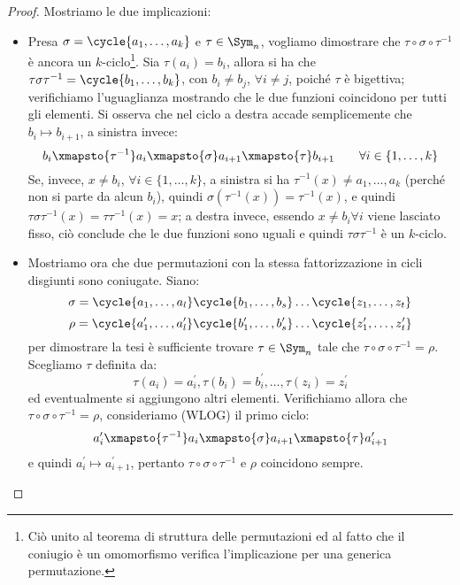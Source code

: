 \documentclass[11pt]{scrartcl}
\begin{document}
\begin{proof}
    Mostriamo le due implicazioni:
        \begin{itemize}
            \item Presa $\sigma = \cycle{a_1,\ldots,a_k}$ e $\tau \in \Sym_n$, vogliamo dimostrare che $\tau\circ\sigma\circ\tau^{-1}$ è ancora un $k$-ciclo\footnote{Ciò unito al teorema di struttura delle permutazioni ed al fatto che il coniugio è un omomorfismo verifica l'implicazione per una generica permutazione.}.
                Sia $\tau(a_i) = b_i$, allora si ha che $\tau\sigma\tau^{-1} = \cycle{b_1,\ldots,b_k}$, con $b_i \ne b_j$, $\forall i \ne j$, poiché $\tau$ è bigettiva; verifichiamo
                l'uguaglianza mostrando che le due funzioni coincidono per tutti gli elementi. Si osserva che nel ciclo a destra accade semplicemente che $b_i \longmapsto b_{i+1}$, a sinistra invece:
                    \[ b_i \xmapsto{\tau^{-1}} a_i \xmapsto{\sigma} a_{i+1} \xmapsto{\tau} b_{i+1} \qquad \forall i \in \{1,\ldots,k\}
                        \]
                Se, invece, $x \ne b_i$, $\forall i \in \{1,\ldots,k\}$, a sinistra si ha $\tau^{-1}(x) \ne a_1,\ldots,a_k$ (perché non si parte da alcun $b_i$), quindi $\sigma(\tau^{-1}(x)) = \tau^{-1}(x)$, e quindi
                $\tau\sigma\tau^{-1}(x) = \tau \tau^{-1} (x) = x$; a destra invece, essendo $x \ne b_i \forall i$ viene lasciato fisso, ciò conclude che le due funzioni sono uguali e quindi $\tau\sigma\tau^{-1}$ è un $k$-ciclo.
            \item Mostriamo ora che due permutazioni con la stessa fattorizzazione in cicli disgiunti sono coniugate. Siano:
                \[ \sigma = \cycle{a_1, \ldots, a_l}\cycle{b_1, \ldots, b_s} \ldots \cycle{z_1, \ldots, z_t}
                    \]\[ \rho = \cycle{a_1^{\prime}, \ldots, a_l^{\prime}}\cycle{b_1^{\prime}, \ldots, b_s^{\prime}} \ldots \cycle{z_1^{\prime}, \ldots, z_t^{\prime}}
                        \]
                per dimostrare la tesi è sufficiente trovare $\tau \in \Sym_n$ tale che $\tau\circ\sigma\circ\tau^{-1} = \rho$. Scegliamo $\tau$ definita da:
                    \[ \tau(a_i) = a_i^{\prime}, \tau(b_i) = b_i^{\prime}, \ldots, \tau(z_i) = z_i^{\prime}
                        \]
                ed eventualmente si aggiungono altri elementi. Verifichiamo allora che $\tau\circ\sigma\circ\tau^{-1} = \rho$, consideriamo (WLOG) il primo ciclo:
                    \[ a_i^{\prime} \xmapsto{\tau^{-1}} a_i \xmapsto{\sigma} a_{i+1} \xmapsto{\tau} a_{i+1}^{\prime}
                        \]
                e quindi $a_i^{\prime} \longmapsto a_{i+1}^{\prime}$, pertanto $\tau\circ\sigma\circ\tau^{-1}$ e $\rho$ coincidono sempre.
        \end{itemize}
\end{proof}
\end{document}
